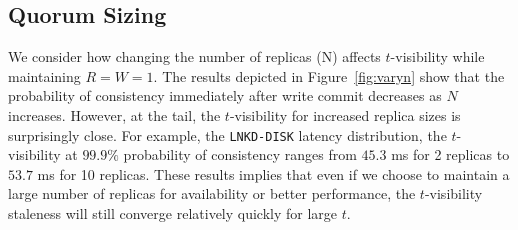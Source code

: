 \documentclass{vldb}
\newcommand{\subsectionskip}{-0em}
\begin{document}
\vspace{\subsectionskip}\subsection{Quorum Sizing}

We consider how changing the number of replicas (N) affects
$t$-visibility while maintaining $R$$=$$W$$=$$1$. The results depicted
in Figure~\ref{fig:varyn} show that the probability of consistency
immediately after write commit decreases as $N$ increases.  However,
at the tail, the $t$-visibility for increased replica sizes is
surprisingly close.  For example, the \texttt{LNKD-DISK} latency
distribution, the $t$-visibility at $99.9\%$ probability of
consistency ranges from $45.3$ ms for 2 replicas to $53.7$ ms for 10
replicas.   These results implies that even if
we choose to maintain a large number of replicas for availability or
better performance, the $t$-visibility staleness will still converge
relatively quickly for large $t$.
\end{document}
